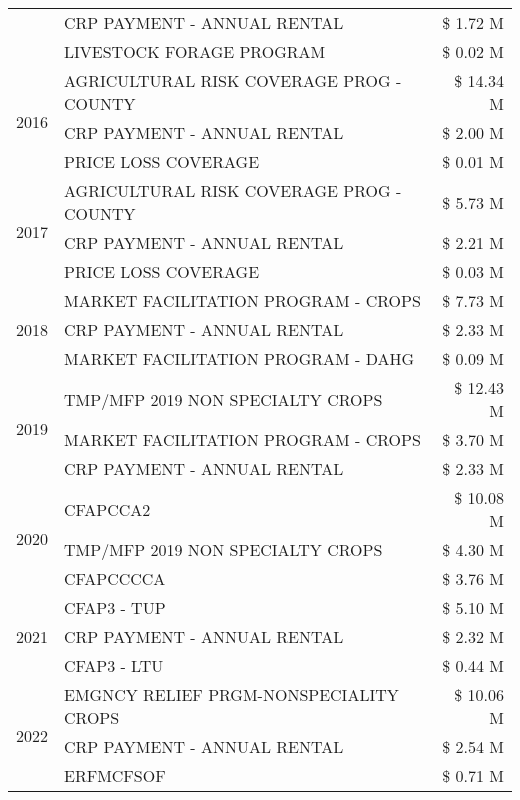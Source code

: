 \begin{tabular}{llr}
 & CRP PAYMENT - ANNUAL RENTAL & \$ 1.72 M \\
 & LIVESTOCK FORAGE PROGRAM & \$ 0.02 M \\
\cline{1-3}
\multirow[t]{3}{*}{2016} & AGRICULTURAL RISK COVERAGE PROG - COUNTY & \$ 14.34 M \\
 & CRP PAYMENT - ANNUAL RENTAL & \$ 2.00 M \\
 & PRICE LOSS COVERAGE & \$ 0.01 M \\
\cline{1-3}
\multirow[t]{3}{*}{2017} & AGRICULTURAL RISK COVERAGE PROG - COUNTY & \$ 5.73 M \\
 & CRP PAYMENT - ANNUAL RENTAL & \$ 2.21 M \\
 & PRICE LOSS COVERAGE & \$ 0.03 M \\
\cline{1-3}
\multirow[t]{3}{*}{2018} & MARKET FACILITATION PROGRAM - CROPS & \$ 7.73 M \\
 & CRP PAYMENT - ANNUAL RENTAL & \$ 2.33 M \\
 & MARKET FACILITATION PROGRAM - DAHG & \$ 0.09 M \\
\cline{1-3}
\multirow[t]{3}{*}{2019} & TMP/MFP 2019 NON SPECIALTY CROPS & \$ 12.43 M \\
 & MARKET FACILITATION PROGRAM - CROPS & \$ 3.70 M \\
 & CRP PAYMENT - ANNUAL RENTAL & \$ 2.33 M \\
\cline{1-3}
\multirow[t]{3}{*}{2020} & CFAPCCA2 & \$ 10.08 M \\
 & TMP/MFP 2019 NON SPECIALTY CROPS & \$ 4.30 M \\
 & CFAPCCCCA & \$ 3.76 M \\
\cline{1-3}
\multirow[t]{3}{*}{2021} & CFAP3 - TUP & \$ 5.10 M \\
 & CRP PAYMENT - ANNUAL RENTAL & \$ 2.32 M \\
 & CFAP3 - LTU & \$ 0.44 M \\
\cline{1-3}
\multirow[t]{3}{*}{2022} & EMGNCY RELIEF PRGM-NONSPECIALITY CROPS & \$ 10.06 M \\
 & CRP PAYMENT - ANNUAL RENTAL & \$ 2.54 M \\
 & ERFMCFSOF & \$ 0.71 M \\
\cline{1-3}
\bottomrule
\end{tabular}
